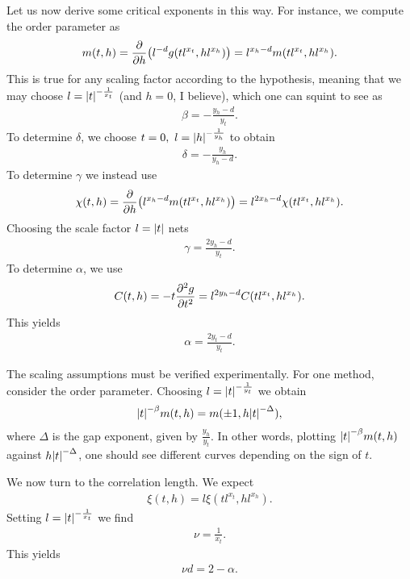 Let us now derive some critical exponents in this way. For instance, we compute the order parameter as
\begin{align*}
	m(t, h) = \pdv{h}(l^{-d}g(tl^{x_{t}}, hl^{x_{h}})) = l^{x_{h} - d}m(tl^{x_{t}}, hl^{x_{h}}).
\end{align*}
This is true for any scaling factor according to the hypothesis, meaning that we may choose $l = \abs{t}^{-\frac{1}{x_{t}}}$ (and $h = 0$, I believe), which one can squint to see as
\begin{align*}
	\beta = -\frac{y_{h} - d}{y_{t}}.
\end{align*}
To determine $\delta$, we choose $t = 0,\ l = \abs{h}^{-\frac{1}{y_{h}}}$ to obtain
\begin{align*}
	\delta = -\frac{y_{h}}{y_{h} - d}.
\end{align*}
To determine $\gamma$ we instead use
\begin{align*}
	\chi(t, h) = \pdv{h}(l^{x_{h} - d}m(tl^{x_{t}}, hl^{x_{h}})) = l^{2x_{h} - d}\chi(tl^{x_{t}}, hl^{x_{h}}).
\end{align*}
Choosing the scale factor $l = \abs{t}$ nets
\begin{align*}
	\gamma = \frac{2y_{h} - d}{y_{t}}.
\end{align*}
To determine $\alpha$, we use
\begin{align*}
	C(t, h) = -t\pdv[2]{g}{t} = l^{2y_{h} - d}C(tl^{x_{t}}, hl^{x_{h}}).
\end{align*}
This yields
\begin{align*}
	\alpha = \frac{2y_{t} - d}{y_{t}}.
\end{align*}

The scaling assumptions must be verified experimentally. For one method, consider the order parameter. Choosing $l = \abs{t}^{-\frac{1}{y_{t}}}$ we obtain
\begin{align*}
	\abs{t}^{-\beta}m(t, h) = m(\pm 1, h\abs{t}^{-\Delta}),
\end{align*}
where $\Delta$ is the gap exponent, given by $\frac{y_{h}}{y_{t}}$. In other words, plotting $\abs{t}^{-\beta}m(t, h)$ against $h\abs{t}^{-\Delta}$, one should see different curves depending on the sign of $t$.

We now turn to the correlation length. We expect
\begin{align*}
	\xi(t, h) = l\xi(tl^{x_{t}}, hl^{x_{h}}).
\end{align*}
Setting $l = \abs{t}^{-\frac{1}{x_{t}}}$ we find
\begin{align*}
	\nu = \frac{1}{x_{t}}.
\end{align*}
This yields
\begin{align*}
	\nu d = 2 - \alpha.
\end{align*}

